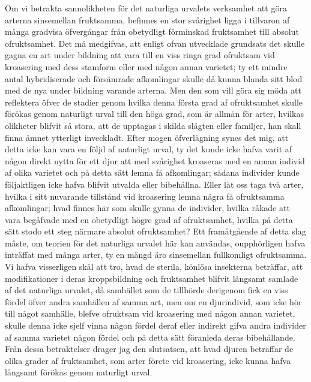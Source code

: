 Om vi betrakta sannolikheten för det naturliga urvalets verksamhet att göra arterna sinsemellan fruktsamma, befinnes en stor svårighet ligga i tillvaron af många gradvisa öfvergångar från obetydligt förminskad fruktsamhet till absolut ofruktsamhet. Det må medgifvas, att enligt ofvan utvecklade grundsats det skulle gagna en art under bildning att vara till en viss ringa grad ofruktsam vid kroasering med dess stamform eller med någon annan varietet; ty ett mindre antal hybridiserade och försämrade afkomlingar skulle då kunna blanda sitt blod med de nya under bildning varande arterna. Men den som vill göra sig möda att reflektera öfver de stadier genom hvilka denna första grad af ofruktsamhet skulle förökas genom naturligt urval till den höga grad, som är allmän för arter, hvilkas olikheter blifvit så stora, att de upptagas i skilda slägten eller familjer, han skall finna ämnet ytterligt inveckladt. Efter mogen öfverlägning synes det mig, att detta icke kan vara en följd af naturligt urval, ty det kunde icke hafva varit af någon direkt nytta för ett djur att med svårighet kroaseras med en annan individ af olika varietet och på detta sätt lemna få afkomlingar; sådana individer kunde följaktligen icke hafva blifvit utvalda eller bibehållna. Eller låt oss taga två arter, hvilka i sitt nuvarande tillstånd vid kroasering lemna några få ofruktsamma afkomlingar; hvad finnes här som skulle gynna de individer, hvilka råkade att vara begåfvade med en obetydligt högre grad af ofruktsamhet, hvilka på detta sätt stodo ett steg närmare absolut ofruktsamhet? Ett framåtgående af detta slag måste, om teorien för det naturliga urvalet här kan användas, oupphörligen hafva inträffat med många arter, ty en mängd äro sinsemellan fullkomligt ofruktsamma. Vi hafva visserligen skäl att tro, hvad de sterila, könlösa insekterna beträffar, att modifikationer i deras kroppsbildning och fruktsamhet blifvit långsamt samlade af det naturliga urvalet, då samhället som de tillhörde derigenom fick en viss fördel öfver andra samhällen af samma art, men om en djurindivid, som icke hör till något samhälle, blefve ofruktsam vid kroasering med någon annan varietet, skulle denna icke sjelf vinna någon fördel deraf eller indirekt gifva andra individer af samma varietet någon fördel och på detta sätt föranleda deras bibehållande. Från dessa betraktelser drager jag den slutsatsen, att hvad djuren beträffar de olika grader af fruktsamhet, som arter förete vid kroasering, icke kunna hafva långsamt förökas genom naturligt urval.

